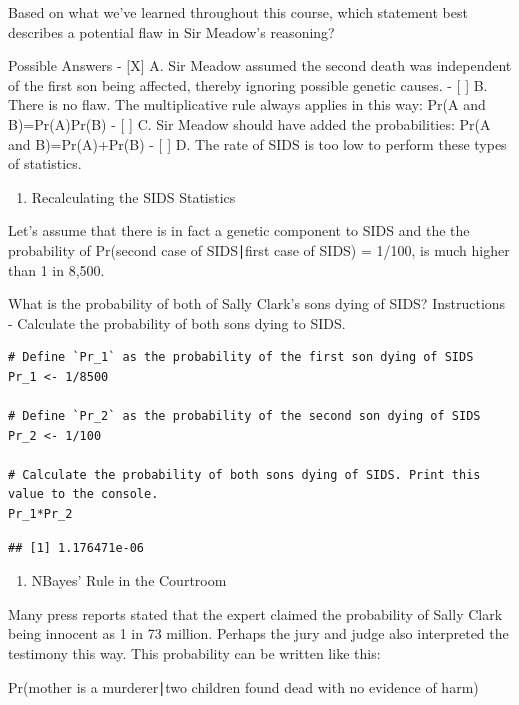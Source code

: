 \documentclass[
]{article}
\providecommand{\tightlist}{%
  \setlength{\itemsep}{0pt}\setlength{\parskip}{0pt}}
\begin{document}
Based on what we've learned throughout this course, which statement best
describes a potential flaw in Sir Meadow's reasoning?

Possible Answers - {[}X{]} A. Sir Meadow assumed the second death was
independent of the first son being affected, thereby ignoring possible
genetic causes. - {[} {]} B. There is no flaw. The multiplicative rule
always applies in this way: Pr(A and B)=Pr(A)Pr(B) - {[} {]} C. Sir
Meadow should have added the probabilities: Pr(A and B)=Pr(A)+Pr(B) -
{[} {]} D. The rate of SIDS is too low to perform these types of
statistics.

\begin{enumerate}
\def\labelenumi{\arabic{enumi}.}
\setcounter{enumi}{1}
\tightlist
\item
  Recalculating the SIDS Statistics
\end{enumerate}

Let's assume that there is in fact a genetic component to SIDS and the
the probability of Pr(second case of SIDS∣first case of SIDS) = 1/100,
is much higher than 1 in 8,500.

What is the probability of both of Sally Clark's sons dying of SIDS?
Instructions - Calculate the probability of both sons dying to SIDS.

\begin{verbatim}
# Define `Pr_1` as the probability of the first son dying of SIDS
Pr_1 <- 1/8500

# Define `Pr_2` as the probability of the second son dying of SIDS
Pr_2 <- 1/100

# Calculate the probability of both sons dying of SIDS. Print this value to the console.
Pr_1*Pr_2
\end{verbatim}

\begin{verbatim}
## [1] 1.176471e-06
\end{verbatim}

\begin{enumerate}
\def\labelenumi{\arabic{enumi}.}
\setcounter{enumi}{2}
\tightlist
\item
  NBayes' Rule in the Courtroom
\end{enumerate}

Many press reports stated that the expert claimed the probability of
Sally Clark being innocent as 1 in 73 million. Perhaps the jury and
judge also interpreted the testimony this way. This probability can be
written like this:

Pr(mother is a murderer∣two children found dead with no evidence of
harm)
\end{document}
